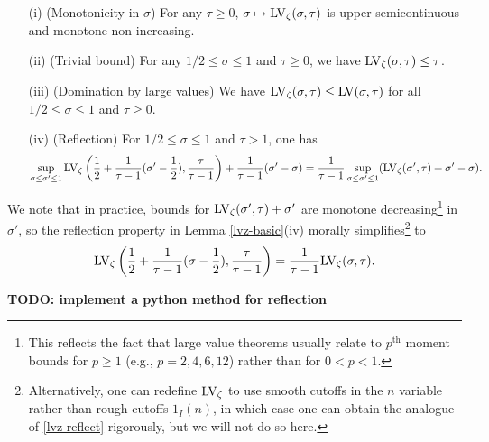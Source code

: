 \begin{lemma}\label{lvz-basic}
    \begin{itemize}
        \item[(i)] (Monotonicity in $\sigma$) For any $\tau \geq 0$, $\sigma \mapsto \mathrm{LV}_\zeta(\sigma,\tau)$ is upper semicontinuous and monotone non-increasing.
        \item[(ii)] (Trivial bound) For any $1/2 \leq \sigma \leq 1$ and $\tau \geq 0$, we have $\mathrm{LV}_\zeta(\sigma,\tau) \leq \tau$.
        \item[(iii)] (Domination by large values)  We have $\mathrm{LV}_\zeta(\sigma,\tau) \leq \mathrm{LV}(\sigma,\tau)$ for all $1/2 \leq \sigma \leq 1$ and $\tau \geq 0$.
        \item[(iv)] (Reflection) For $1/2 \leq \sigma \leq 1$ and $\tau > 1$, one has
        $$ \sup_{\sigma \leq \sigma' \leq 1} \mathrm{LV}_\zeta\left(\frac{1}{2} + \frac{1}{\tau-1} (\sigma'-\frac{1}{2}), \frac{\tau}{\tau-1}\right) + \frac{1}{\tau-1} (\sigma'-\sigma) = \frac{1}{\tau-1} \sup_{\sigma \leq \sigma' \leq 1} (\mathrm{LV}_\zeta(\sigma',\tau) + \sigma'-\sigma).$$
    \end{itemize}
\end{lemma}


We note that in practice, bounds for $\mathrm{LV}_\zeta(\sigma',\tau)+\sigma'$ are monotone decreasing\footnote{This reflects the fact that large value theorems usually relate to $p^{\mathrm{th}}$ moment bounds for $p \geq 1$ (e.g., $p = 2, 4, 6, 12$) rather than for $0 < p < 1$.} in $\sigma'$, so the reflection property in Lemma \ref{lvz-basic}(iv) morally simplifies\footnote{Alternatively, one can redefine $\mathrm{LV}_\zeta$ to use smooth cutoffs in the $n$ variable rather than rough cutoffs $1_I(n)$, in which case one can obtain the analogue of \eqref{lvz-reflect} rigorously, but we will not do so here.} to
\begin{equation}\label{lvz-reflect}
     \mathrm{LV}_\zeta\left(\frac{1}{2} + \frac{1}{\tau-1} (\sigma-\frac{1}{2}), \frac{\tau}{\tau-1}\right) = \frac{1}{\tau-1} \mathrm{LV}_\zeta(\sigma,\tau).
\end{equation}

{\bf TODO: implement a python method for reflection}

